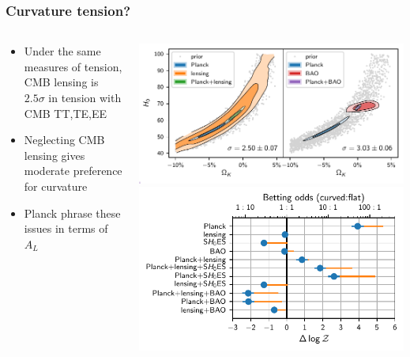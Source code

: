\documentclass[%
]{beamer}
\begin{document}
\begin{frame}
    \frametitle{Curvature tension?}
    \begin{columns}
        \begin{column}{0.4\textwidth}
        \begin{itemize}
            \item Under the same measures of tension, CMB lensing is $2.5\sigma$ in tension with CMB TT,TE,EE
            \item Neglecting CMB lensing gives moderate preference for curvature
            \item Planck phrase these issues in terms of $A_L$
        \end{itemize}
        \end{column}
        \begin{column}{0.6\textwidth}
            \includegraphics[width=\textwidth]{./figures/omegak_H0_2.pdf}
            \includegraphics[width=\textwidth]{./figures/evidences.pdf}
        \end{column}
    \end{columns}
\end{frame}
\end{document}
